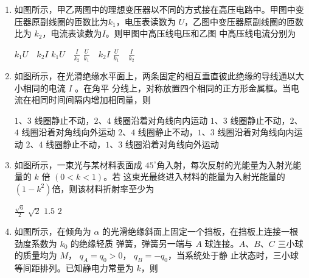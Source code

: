 \begin{enumerate}
\item
如图所示，甲乙两图中的理想变压器以不同的方式接在高压电路中。甲图中变压器原副线圈的匝数比为$ k_{1} $，电压表读数为 $ U $，乙图中变压器原副线圈的匝数比为 $ k_{2} $，电流表读数为$ I $。则甲图中高压线电压和乙图
中高压线电流分别为  
\begin{figure}[h!]
\centering

\end{figure}

\fourchoices
{$k_{1} U \quad k_{2} I$}
{$ k_{1} U \quad \frac{I}{k_{2}}$}
{$\frac{U}{k_{1}} \quad k_{2} I$}
{$\frac{U}{k_{1}} \quad \frac{I}{k_{2}}$}


\item
如图所示，在光滑绝缘水平面上，两条固定的相互垂直彼此绝缘的导线通以大小相同的电流 $ I $ 。在角平
分线上，对称放置四个相同的正方形金属框。当电流在相同时间间隔内增加相同量，则  
\begin{figure}[h!]
\centering

\end{figure}


\fourchoices
{$ 1 $、$ 3 $ 线圈静止不动，$ 2 $、$ 4 $ 线圈沿着对角线向内运动}
{$ 1 $、$ 3 $ 线圈静止不动，$ 2 $、$ 4 $ 线圈沿着对角线向外运动}
{$ 2 $、$ 4 $ 线圈静止不动，$ 1 $、$ 3 $ 线圈沿着对角线向内运动}
{$ 2 $、$ 4 $ 线圈静止不动，$ 1 $、$ 3 $ 线圈沿着对角线向外运动}


\newpage
\item
如图所示，一束光与某材料表面成 $ 45 ^{ \circ } $角入射，每次反射的光能量为入射光能量的 $ k $ 倍 $ (0<k<1) $。若
这束光最终进入材料的能量为入射光能量的 $ (1-k^{2}) $倍，则该材料折射率至少为  
\begin{figure}[h!]
\centering

\end{figure}

\fourchoices
{$\frac{\sqrt{6}}{2}$}
{$\sqrt{2}$}
{$ 1.5 $}
{$ 2 $}


\item
如图所示，在倾角为 $ \alpha $ 的光滑绝缘斜面上固定一个挡板，在挡板上连接一根劲度系数为 $ k_{0} $ 的绝缘轻质
弹簧，弹簧另一端与 $ A $ 球连接。$ A $、$ B $、$ C $ 三小球的质量均为 $ M $， $ q_{A} =q_{0}>0 $， $ q_{B} =-q_{0} $，当系统处于静
止状态时，三小球等间距排列。已知静电力常量为 $ k $，则  
\begin{figure}[h!]
\centering

\end{figure}



\end{enumerate}
